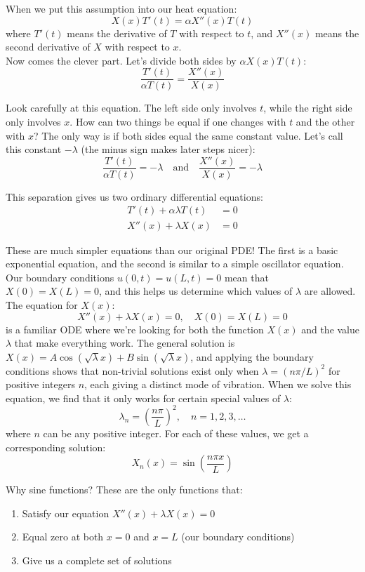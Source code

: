\noindent When we put this assumption into our heat equation:
\[
X(x)T'(t) = \alpha X''(x)T(t)
\]
where $T'(t)$ means the derivative of $T$ with respect to $t$, and $X''(x)$ means the second derivative of $X$ with respect to $x$. \\

\noindent Now comes the clever part. Let's divide both sides by $\alpha X(x)T(t)$:
\[
\frac{T'(t)}{\alpha T(t)} = \frac{X''(x)}{X(x)}
\]

\noindent Look carefully at this equation. The left side only involves $t$, while the right side only involves $x$. How can two things be equal if one changes with $t$ and the other with $x$? The only way is if both sides equal the same constant value. Let's call this constant $-\lambda$ (the minus sign makes later steps nicer):
\[
\frac{T'(t)}{\alpha T(t)} = -\lambda \quad \text{and} \quad \frac{X''(x)}{X(x)} = -\lambda
\]

\noindent This separation gives us two ordinary differential equations:
\begin{align*}
T'(t) + \alpha\lambda T(t) &= 0 \\
X''(x) + \lambda X(x) &= 0
\end{align*}

\noindent These are much simpler equations than our original PDE! The first is a basic exponential equation, and the second is similar to a simple oscillator equation. Our boundary conditions $u(0,t) = u(L,t) = 0$ mean that $X(0) = X(L) = 0$, and this helps us determine which values of $\lambda$ are allowed. \\

\noindent The equation for $X(x)$:
\[
X''(x) + \lambda X(x) = 0, \quad X(0) = X(L) = 0
\]
is a familiar ODE where we're looking for both the function $X(x)$ and the value $\lambda$ that make everything work. The general solution is $X(x) = A\cos(\sqrt{\lambda}x) + B\sin(\sqrt{\lambda}x)$, and applying the boundary conditions shows that non-trivial solutions exist only when $\lambda = (n\pi/L)^2$ for positive integers $n$, each giving a distinct mode of vibration. When we solve this equation, we find that it only works for certain special values of $\lambda$:
\[
\lambda_n = \left(\frac{n\pi}{L}\right)^2, \quad n = 1,2,3,\ldots
\]
where $n$ can be any positive integer. For each of these values, we get a corresponding solution:
\[
X_n(x) = \sin\left(\frac{n\pi x}{L}\right)
\]

\noindent Why sine functions? These are the only functions that:
\begin{enumerate}
   \item Satisfy our equation $X''(x) + \lambda X(x) = 0$
   \item Equal zero at both $x=0$ and $x=L$ (our boundary conditions)
   \item Give us a complete set of solutions
\end{enumerate}

